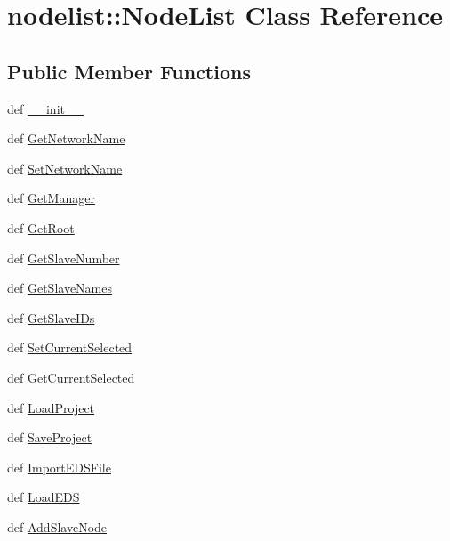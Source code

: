 \hypertarget{classnodelist_1_1NodeList}{
\section{nodelist::Node\-List Class Reference}
\label{classnodelist_1_1NodeList}
}
\subsection*{Public Member Functions}
\begin{CompactItemize}
\item 
def \hyperlink{classnodelist_1_1NodeList_c6e80d9c4b17421a74aae47e39e22ffb}{\_\-\_\-init\_\-\_\-}
\item 
def \hyperlink{classnodelist_1_1NodeList_f251a2599ab39f05f72debe9194ef730}{Get\-Network\-Name}
\item 
def \hyperlink{classnodelist_1_1NodeList_9d82bcfef0a88d2c9135cf5a8e2ff047}{Set\-Network\-Name}
\item 
def \hyperlink{classnodelist_1_1NodeList_1b2aa331c3a0f257629450ffbb658714}{Get\-Manager}
\item 
def \hyperlink{classnodelist_1_1NodeList_5660c96280f53eb22d49ae3ef87857b5}{Get\-Root}
\item 
def \hyperlink{classnodelist_1_1NodeList_88204b493bfb5af7a4106f79ce65e377}{Get\-Slave\-Number}
\item 
def \hyperlink{classnodelist_1_1NodeList_ae2a228b04ac23eced9749346e06cf09}{Get\-Slave\-Names}
\item 
def \hyperlink{classnodelist_1_1NodeList_e95b562c7c695ea8c2a3dee38b7c4ef2}{Get\-Slave\-IDs}
\item 
def \hyperlink{classnodelist_1_1NodeList_007fad3e7173fb04f35df65d93690c19}{Set\-Current\-Selected}
\item 
def \hyperlink{classnodelist_1_1NodeList_31139aa84f679ccd6b60c0d2e291cead}{Get\-Current\-Selected}
\item 
def \hyperlink{classnodelist_1_1NodeList_e0c626e2b7b68c2497f77b822b6fa88f}{Load\-Project}
\item 
def \hyperlink{classnodelist_1_1NodeList_b90b33e930a1d08ad4bb81f912c30a68}{Save\-Project}
\item 
def \hyperlink{classnodelist_1_1NodeList_2bf9abf09b0dd06a8801b9e23f6387cb}{Import\-EDSFile}
\item 
def \hyperlink{classnodelist_1_1NodeList_88cdff50bbef6974b09880f5dd772a26}{Load\-EDS}
\item 
def \hyperlink{classnodelist_1_1NodeList_4eec8b1c1d88c4806f470f8afcc53e10}{Add\-Slave\-Node}

\end{CompactItemize}
